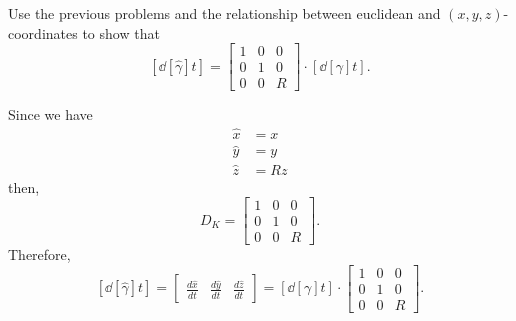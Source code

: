 \documentclass[newpage,hints,handout]{ximera}
\begin{document}
\begin{problem}
  Use the previous problems and the relationship between euclidean and
  $(x,y,z)$-coordinates to show that
  \[
  \left[\dd[\hat{\gamma}]{t}\right] =
  \begin{bmatrix}
    1 & 0 & 0\\
    0 & 1 & 0\\
    0 & 0 & R
  \end{bmatrix}\cdot \left[ \dd[\gamma]{t}\right].
  \]
  
\begin{freeResponse}
Since we have 
\begin{align*}
\hat{x}  &  =x\\
\hat{y}  &  =y\\
\hat{z}  &  =Rz
\end{align*}
then, 
\[
D_K = 
 \begin{bmatrix}
    1 & 0 & 0\\
    0 & 1 & 0\\
    0 & 0 & R
  \end{bmatrix}.
  \]
  Therefore, 
  \[
 \left[\dd[\hat{\gamma}]{t}\right] 
= \begin{bmatrix}
\frac{d\hat{x}}{dt} & \frac{d\hat{y}}{dt} & \frac{d\hat{z}}{dt}%
\end{bmatrix}
= \left[ \dd[\gamma]{t}\right] \cdot
  \begin{bmatrix}
    1 & 0 & 0\\
    0 & 1 & 0\\
    0 & 0 & R
  \end{bmatrix}.
\]
\end{freeResponse}

\end{problem}
\end{document}
